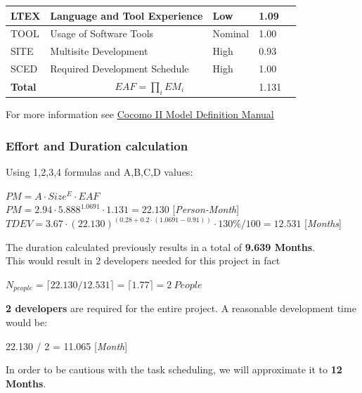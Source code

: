 \documentclass{article}
\begin{document}
\begin{table}[h!]
\begin{tabular}{| l | l | l | l | l |}
				\hline
				LTEX           & Language and Tool Experience             & Low                 & 1.09              \\
				\hline
				TOOL           & Usage of Software Tools                  & Nominal             & 1.00              \\
				\hline
				SITE           & Multisite Development                    & High                & 0.93              \\
				\hline
				SCED           & Required Development Schedule            & High                & 1.00              \\
				\hline
				\textbf{Total} & \multicolumn{2}{|c|}{$EAF=\prod_i EM_i$}                       & 1.131            \\
				\hline
			\end{tabular}
		\end{table}
	
		For more information see \href{run:Cocomo II Model Definition Manual.pdf}{\underline{Cocomo II Model Definition Manual}}
		\pagebreak
		
		\subsubsection{Effort and Duration calculation}
		Using 1,2,3,4 formulas and A,B,C,D values:
		\begin{center}
			$PM = A\cdot Size^{E}\cdot EAF$\\ \bigskip
			$PM = 2.94\cdot 5.888^{1.0691}\cdot 1.131 = 22.130$ [\textit{Person-Month}]\\ \bigskip
			$TDEV = 3.67\cdot(22.130)^{(0.28+0.2\cdot (1.0691-0.91))}\cdot 130\% / 100 = 12.531$ [\textit{Months}]
		\end{center}
		The duration calculated previously results in a total of \textbf{9.639 Months}.\\
		This would result in 2 developers needed for this project in fact
		\begin{center}
			\(N_{people} = \lceil 22.130 / 12.531 \rceil = \lceil 1.77 \rceil = 2 \ People\)
		\end{center}
		\textbf{2 developers} are required for the entire project. A reasonable development time would be:
		\begin{center}
			22.130 / 2 = 11.065 [\textit{Month}]
		\end{center}
		In order to be cautious with the task scheduling, we will approximate it to \textbf{12 Months}.
		
\end{document}
